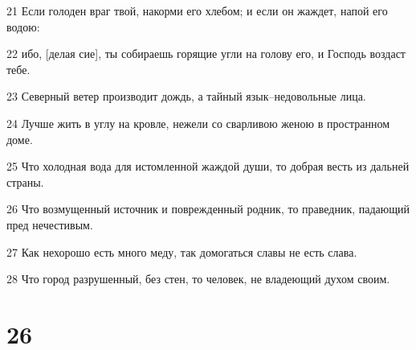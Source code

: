 \par 21 Если голоден враг твой, накорми его хлебом; и если он жаждет, напой его водою:
\par 22 ибо, [делая сие], ты собираешь горящие угли на голову его, и Господь воздаст тебе.
\par 23 Северный ветер производит дождь, а тайный язык--недовольные лица.
\par 24 Лучше жить в углу на кровле, нежели со сварливою женою в пространном доме.
\par 25 Что холодная вода для истомленной жаждой души, то добрая весть из дальней страны.
\par 26 Что возмущенный источник и поврежденный родник, то праведник, падающий пред нечестивым.
\par 27 Как нехорошо есть много меду, так домогаться славы не есть слава.
\par 28 Что город разрушенный, без стен, то человек, не владеющий духом своим.

\chapter{26}

